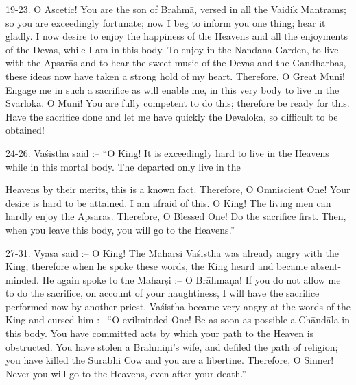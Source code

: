 19-23. O Ascetic! You are the son of Brahm\=a, versed in all the Vaidik Mantrams; so you are exceedingly fortunate; now I beg to inform you one thing; hear it gladly. I now desire to enjoy the happiness of the Heavens and all the enjoyments of the Devas, while I am in this body. To enjoy in the Nandana Garden, to live with the Apsar\=as and to hear the sweet music of the Devas and the Gandharbas, these ideas now have taken a strong hold of my heart. Therefore, O Great Muni! Engage me in such a sacrifice as will enable me, in this very body to live in the Svarloka. O Muni! You are fully competent to do this; therefore be ready for this. Have the sacrifice done and let me have quickly the Devaloka, so difficult to be obtained!

24-26. Va\'sistha said :-- ``O King! It is exceedingly hard to live in the Heavens while in this mortal body. The departed only live in the

Heavens by their merits, this is a known fact. Therefore, O Omniscient One! Your desire is hard to be attained. I am afraid of this. O King! The living men can hardly enjoy the Apsar\=as. Therefore, O Blessed One! Do the sacrifice first. Then, when you leave this body, you will go to the Heavens.''

27-31. Vy\=asa said :-- O King! The Mahar\d{s}i Va\'sistha was already angry with the King; therefore when he spoke these words, the King heard and became absent-minded. He again spoke to the Mahar\d{s}i :-- O Br\=ahma\d{n}a! If you do not allow me to do the sacrifice, on account of your haughtiness, I will have the sacrifice performed now by another priest. Va\'sistha became very angry at the words of the King and cursed him :-- ``O evilminded One! Be as soon as possible a Ch\=and\=ala in this body. You have committed acts by which your path to the Heaven is obstructed. You have stolen a Br\=ahmi\d{n}i's wife, and defiled the path of religion; you have killed the Surabhi Cow and you are a libertine. Therefore, O Sinner! Never you will go to the Heavens, even after your death.''

